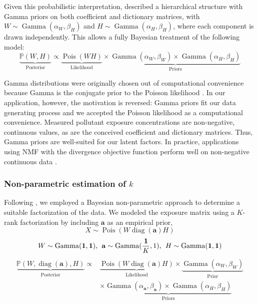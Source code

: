Given this probabilistic interpretation, \citet{cemgil2008bayesian} described a hierarchical structure with Gamma priors on both coefficient and dictionary matrices, with ${W \sim \operatorname{Gamma}(\alpha_{W}, \beta_{H})}$ and ${H \sim \operatorname{Gamma}(\alpha_{H}, \beta_{H})}$, where each component is drawn independently. This allows a fully Bayesian treatment of the following model:
\begin{equation}
    \underbrace{\mathbb{P}(W, H)}_{\text{Posterior}}
    \propto \underbrace{\operatorname{Pois}(W H)}_{\text{Likelihood}}
    \times \underbrace{\operatorname{Gamma}(\alpha_W, \beta_W) 
    \times \operatorname{Gamma}(\alpha_H, \beta_H)}_{\text{Priors}}
\end{equation} 

Gamma distributions were originally chosen out of computational convenience because Gamma is the conjugate prior to the Poisson likelihood \cite{cemgil2008bayesian}. In our application, however, the motivation is reversed: Gamma priors fit our data generating process and we accepted the Poisson likelihood as a computational convenience. Measured pollutant exposure concentrations are non-negative, continuous values, as are the conceived coefficient and dictionary matrices. Thus, Gamma priors are well-suited for our latent factors. In practice, applications using NMF with the divergence objective function perform well on non-negative continuous data \cite{brunet2004metagenes, fevotte2009nonnegative}.

\subsubsection{Non-parametric estimation of $k$}
\label{methods_k}
Following \citet{holtzman2018machine}, we employed a Bayesian non-parametric approach to determine a suitable factorization of the data. We modeled the exposure matrix using a $K$-rank factorization by including $\mathbf{a}$ as an empirical prior,
\begin{equation*}
{X \sim \operatorname{Pois}\left(W \operatorname{diag}(\mathbf{a}) H\right)}
\end{equation*}
\vspace{-5ex}
\begin{equation*}
{W \sim \operatorname{Gamma}(\mathbf{1}, \mathbf{1})}, \hspace{1ex}
{\mathbf{a} \sim \operatorname{Gamma}(\frac{\mathbf{1}}{K}, 1)}, \hspace{1ex} 
{H \sim \operatorname{Gamma}(\mathbf{1}, \mathbf{1})}
\end{equation*}
\vspace{-5ex}
\begin{align}
    \underbrace{\mathbb{P}(W, \operatorname{diag}(\mathbf{a}), H)}_{\text{Posterior}}
    \propto & \underbrace{\operatorname{Pois}(W\operatorname{diag}(\mathbf{a})H)}_{\text{Likelihood}}
    \times \underbrace{\operatorname{Gamma}(\alpha_W, \beta_W)}_{\text{Prior}} \\
    & \times \underbrace{\operatorname{Gamma}(\alpha_\mathbf{a}, \beta_\mathbf{a}) 
    \times \operatorname{Gamma}(\alpha_H, \beta_H)}_{\text{Priors}} \nonumber
\end{align} 


